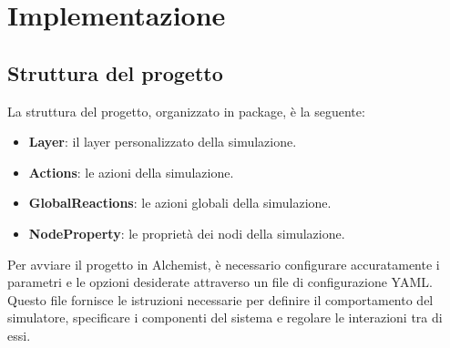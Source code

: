 \chapter{Implementazione}
\section{Struttura del progetto}
La struttura del progetto, organizzato in package, è la seguente:
\begin{itemize}
    \item \textbf{Layer}: il layer personalizzato della simulazione.
    \item \textbf{Actions}: le azioni della simulazione.
    \item \textbf{GlobalReactions}: le azioni globali della simulazione.
    \item \textbf{NodeProperty}: le proprietà dei nodi della simulazione.
\end{itemize}
Per avviare il progetto in Alchemist, è necessario configurare accuratamente i parametri
e le opzioni desiderate attraverso un file di configurazione YAML\@. Questo file fornisce
le istruzioni necessarie per definire il comportamento del simulatore, specificare
i componenti del sistema e regolare le interazioni tra di essi.
\clearpage
